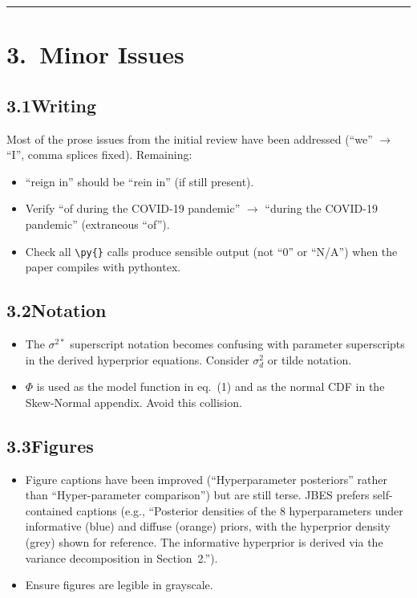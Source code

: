 \documentclass[12pt,a4paper]{article}
\begin{document}
\vspace{0.5em}
\hrule
\vspace{0.5em}

\section{3.\ Minor Issues}

\subsection{3.1\quad Writing}

Most of the prose issues from the initial review have been addressed (``we''
$\to$ ``I'', comma splices fixed).  Remaining:
\begin{itemize}[leftmargin=1.5em]
\item ``reign in'' should be ``rein in'' (if still present).
\item Verify ``of during the COVID-19 pandemic'' $\to$ ``during the COVID-19
pandemic'' (extraneous ``of'').
\item Check all \texttt{\textbackslash py\{\}} calls produce sensible output
(not ``0'' or ``N/A'') when the paper compiles with pythontex.
\end{itemize}

\subsection{3.2\quad Notation}

\begin{itemize}[leftmargin=1.5em]
\item The $\sigma^{2*}$ superscript notation becomes confusing with parameter
superscripts in the derived hyperprior equations.  Consider $\sigma^2_d$ or
tilde notation.
\item $\Phi$ is used as the model function in eq.~(1) and as the normal CDF in
the Skew-Normal appendix.  Avoid this collision.
\end{itemize}

\subsection{3.3\quad Figures}

\begin{itemize}[leftmargin=1.5em]
\item Figure captions have been improved (``Hyperparameter posteriors'' rather
than ``Hyper-parameter comparison'') but are still terse.  JBES prefers
self-contained captions (e.g., ``Posterior densities of the 8 hyperparameters
under informative (blue) and diffuse (orange) priors, with the hyperprior
density (grey) shown for reference.  The informative hyperprior is derived via
the variance decomposition in Section~2.'').
\item Ensure figures are legible in grayscale.
\end{itemize}
\end{document}
